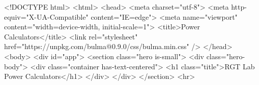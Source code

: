 \documentclass[
  letterpaper,
  DIV=11,
  numbers=noendperiod,
  oneside]{scrartcl}
\newenvironment{Shaded}{\begin{snugshade}}{\end{snugshade}}
\newcommand{\ErrorTok}[1]{\textcolor[rgb]{0.68,0.00,0.00}{#1}}
\newcommand{\NormalTok}[1]{\textcolor[rgb]{0.00,0.23,0.31}{#1}}
\newcommand{\OtherTok}[1]{\textcolor[rgb]{0.00,0.23,0.31}{#1}}
\newcommand{\SpecialCharTok}[1]{\textcolor[rgb]{0.37,0.37,0.37}{#1}}
\newcommand{\StringTok}[1]{\textcolor[rgb]{0.13,0.47,0.30}{#1}}
\begin{document}
\begin{Shaded}
\begin{Highlighting}[]
\SpecialCharTok{\textless{}!}\NormalTok{DOCTYPE html}\SpecialCharTok{\textgreater{}}
\ErrorTok{\textless{}}\NormalTok{html}\SpecialCharTok{\textgreater{}}
  \ErrorTok{\textless{}}\NormalTok{head}\SpecialCharTok{\textgreater{}}
    \ErrorTok{\textless{}}\NormalTok{meta charset}\OtherTok{=}\StringTok{"utf{-}8"}\SpecialCharTok{\textgreater{}}
    \ErrorTok{\textless{}}\NormalTok{meta http}\SpecialCharTok{{-}}\NormalTok{equiv}\OtherTok{=}\StringTok{"X{-}UA{-}Compatible"}\NormalTok{ content}\OtherTok{=}\StringTok{"IE=edge"}\SpecialCharTok{\textgreater{}}
    \ErrorTok{\textless{}}\NormalTok{meta name}\OtherTok{=}\StringTok{"viewport"}\NormalTok{ content}\OtherTok{=}\StringTok{"width=device{-}width, initial{-}scale=1"}\SpecialCharTok{\textgreater{}}
    \ErrorTok{\textless{}}\NormalTok{title}\SpecialCharTok{\textgreater{}}\NormalTok{Power Calculators}\SpecialCharTok{\textless{}}\ErrorTok{/}\NormalTok{title}\SpecialCharTok{\textgreater{}}
    \ErrorTok{\textless{}}\NormalTok{link rel}\OtherTok{=}\StringTok{"stylesheet"}\NormalTok{ href}\OtherTok{=}\StringTok{"https://unpkg.com/bulma@0.9.0/css/bulma.min.css"} \SpecialCharTok{/}\ErrorTok{\textgreater{}}
  \ErrorTok{\textless{}/}\NormalTok{head}\SpecialCharTok{\textgreater{}}
  \ErrorTok{\textless{}}\NormalTok{body}\SpecialCharTok{\textgreater{}}
    \ErrorTok{\textless{}}\NormalTok{div id}\OtherTok{=}\StringTok{"app"}\SpecialCharTok{\textgreater{}}
      \ErrorTok{\textless{}}\NormalTok{section class}\OtherTok{=}\StringTok{"hero is{-}small"}\SpecialCharTok{\textgreater{}}
        \ErrorTok{\textless{}}\NormalTok{div class}\OtherTok{=}\StringTok{"hero{-}body"}\SpecialCharTok{\textgreater{}}
          \ErrorTok{\textless{}}\NormalTok{div class}\OtherTok{=}\StringTok{"container has{-}text{-}centered"}\SpecialCharTok{\textgreater{}}
            \ErrorTok{\textless{}}\NormalTok{h1 class}\OtherTok{=}\StringTok{"title"}\SpecialCharTok{\textgreater{}}\NormalTok{RGT Lab Power Calculators}\SpecialCharTok{\textless{}}\ErrorTok{/}\NormalTok{h1}\SpecialCharTok{\textgreater{}}
          \ErrorTok{\textless{}/}\NormalTok{div}\SpecialCharTok{\textgreater{}}
        \ErrorTok{\textless{}/}\NormalTok{div}\SpecialCharTok{\textgreater{}}
      \ErrorTok{\textless{}/}\NormalTok{section}\SpecialCharTok{\textgreater{}}
            \ErrorTok{\textless{}}\NormalTok{hr}\SpecialCharTok{\textgreater{}}


\end{Highlighting}
\end{Shaded}
\end{document}
